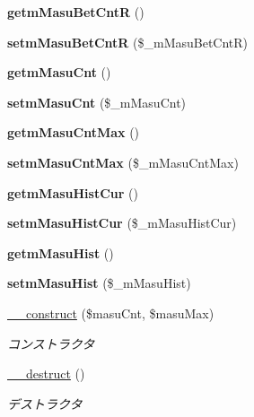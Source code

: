 \begin{DoxyCompactItemize}
{\bfseries getm\+Masu\+Bet\+CntR} ()
\item 
\mbox{\label{class_reversi_aed1c77174f806e8459c288d2818da914}} 
{\bfseries setm\+Masu\+Bet\+CntR} (\$\+\_\+m\+Masu\+Bet\+CntR)
\item 
\mbox{\label{class_reversi_a32cebf699f9aa19d9053c143c3562d3a}} 
{\bfseries getm\+Masu\+Cnt} ()
\item 
\mbox{\label{class_reversi_ad50e5fa90e6a2f53bf71ed04bed603ae}} 
{\bfseries setm\+Masu\+Cnt} (\$\+\_\+m\+Masu\+Cnt)
\item 
\mbox{\label{class_reversi_a3ac7b23d1b6567faa4d58d51a952c859}} 
{\bfseries getm\+Masu\+Cnt\+Max} ()
\item 
\mbox{\label{class_reversi_ae2dbd35c16269ab04a58aba0194f7faf}} 
{\bfseries setm\+Masu\+Cnt\+Max} (\$\+\_\+m\+Masu\+Cnt\+Max)
\item 
\mbox{\label{class_reversi_a577b674fea2b90470da3217b5390fe9c}} 
{\bfseries getm\+Masu\+Hist\+Cur} ()
\item 
\mbox{\label{class_reversi_a827554ef8aeb4c252bf4690c709ef762}} 
{\bfseries setm\+Masu\+Hist\+Cur} (\$\+\_\+m\+Masu\+Hist\+Cur)
\item 
\mbox{\label{class_reversi_a0eb2a30637500aef9245d2f82f68b769}} 
{\bfseries getm\+Masu\+Hist} ()
\item 
\mbox{\label{class_reversi_a26300550a0cc4f665b32426907b8ff0d}} 
{\bfseries setm\+Masu\+Hist} (\$\+\_\+m\+Masu\+Hist)
\item 
\hyperlink{class_reversi_a6667ca490c75777ec233f3ead04c5fd7}{\+\_\+\+\_\+construct} (\$masu\+Cnt, \$masu\+Max)
\begin{DoxyCompactList}\small\item\em コンストラクタ \end{DoxyCompactList}\item 
\hyperlink{class_reversi_a421831a265621325e1fdd19aace0c758}{\+\_\+\+\_\+destruct} ()
\begin{DoxyCompactList}\small\item\em デストラクタ \end{DoxyCompactList}\item 

\end{DoxyCompactItemize}

